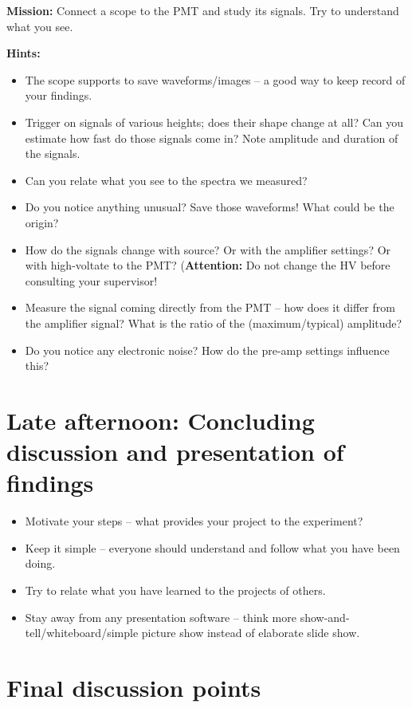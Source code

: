 \documentclass[a4,11pt, notitlepage]{article}
\begin{document}
\noindent\textbf{Mission:} Connect a scope to the PMT and study its
signals. Try to understand what you see.

\noindent\textbf{Hints:}
\begin{itemize}
\item The scope supports to save waveforms/images -- a good way to
  keep record of your findings.
\item Trigger on signals of various heights; does their shape change
  at all? Can you estimate how fast do those signals come in? Note
  amplitude and duration of the signals.
\item Can you relate what you see to
the spectra we measured?
\item Do you notice anything unusual? Save those waveforms! What could
  be the origin?
\item How do the signals change with source? Or with the amplifier
  settings? Or with high-voltate to the
  PMT? (\textbf{Attention:} Do not change the HV before consulting
  your supervisor!
\item Measure the signal coming directly from the PMT -- how does it
  differ from the amplifier signal? What is the ratio of the
  (maximum/typical) amplitude?
\item Do you notice any electronic noise? How do the pre-amp settings
  influence this?
\end{itemize}


\section{Late afternoon: Concluding discussion and presentation of findings}
\label{sec:final-presentation}

\begin{itemize}
\item Motivate your steps -- what provides your project to the experiment?
\item Keep it simple -- everyone should understand and follow what you
  have been doing.
\item Try to relate what you have learned to the projects of
  others.
\item Stay away from any presentation software -- think more
  show-and-tell/whiteboard/simple picture show instead of elaborate slide show.

\end{itemize}

\appendix

\section{Final discussion points}
\label{sec:further-discussion}
\end{document}
